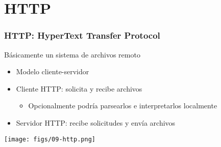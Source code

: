 \documentclass[letter]{beamer}
\begin{document}
\section{HTTP}

\begin{frame}
  \frametitle{HTTP: HyperText Transfer Protocol}

  Básicamente un sistema de archivos remoto
  \begin{itemize}
    \item Modelo cliente-servidor
    \item Cliente HTTP: solicita y recibe archivos
      \begin{itemize}
        \item Opcionalmente podría parsearlos e interpretarlos localmente
      \end{itemize}
    \item Servidor HTTP: recibe solicitudes y envía archivos
  \end{itemize}
  
  \begin{center}
    \texttt{[image: figs/09-http.png]}
  \end{center}

\end{frame}
\end{document}
